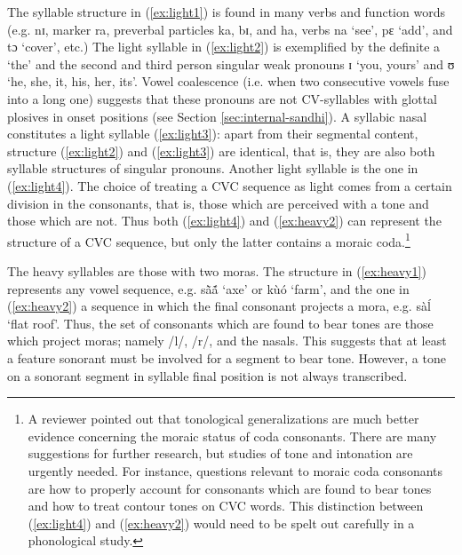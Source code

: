 
 The syllable structure in (\ref{ex:light1}) is  found in many verbs and
function words (e.g.  {\sls nɪ},  marker {\sls ra},
preverbal particles  {\sls ka},  {\sls bɪ}, and {\sls ha}, verbs {\sls na} 
`see', 
{\sls pɛ} `add',  and  {\sls tɔ} `cover', etc.) The light syllable in
(\ref{ex:light2}) is exemplified by the definite  {\sls a} `the' and
the
second and third person singular weak pronouns {\sls ɪ} `you, yours'  and  
{\sls 
ʊ}
 `he, she, it, his, her, its'. Vowel
coalescence (i.e. when two consecutive vowels fuse into a long one) suggests 
that these pronouns are not CV-syllables with glottal plosives in onset 
positions  (see Section \ref{sec:internal-sandhi}).  A syllabic nasal constitutes
a light syllable (\ref{ex:light3}): apart from their segmental content, 
structure (\ref{ex:light2}) and (\ref{ex:light3}) are identical, that is, they are also 
both syllable structures of singular pronouns.  Another light syllable is the 
one in (\ref{ex:light4}). The choice of treating a CVC sequence as light comes 
from a certain division in the consonants, that is,  those which are perceived 
with a tone and those which are not. Thus both (\ref{ex:light4}) and 
(\ref{ex:heavy2}) can represent the structure of a CVC sequence, but only the 
latter contains a moraic coda.\footnote{A reviewer pointed out that tonological generalizations are much better evidence concerning the moraic status of coda consonants. There are many  suggestions for further research, but studies of tone and intonation are urgently needed. For instance, questions relevant to moraic coda consonants are how to  properly account for consonants which are found to bear tones and how to  treat contour tones on CVC words.  This distinction between (\ref{ex:light4}) and (\ref{ex:heavy2}) would need to be spelt out carefully in a phonological study.}



The heavy syllables are those with two moras. The structure  in 
(\ref{ex:heavy1}) represents any vowel sequence, e.g. {\sls sã̀ã́} `axe' or 
{\sls  kùó}  `farm', and the one in (\ref{ex:heavy2}) a sequence in which the 
final consonant projects a mora, e.g.  {\sls sàĺ} `flat  roof'. Thus, the set 
of consonants which are found to bear tones are those which project moras; namely /{l}/, /{r}/,  and the nasals. This suggests  that at least a feature 
{\sc sonorant}  must be involved for a segment to bear tone. However,  a tone on a {\sc sonorant} segment in syllable final position is not always transcribed. 


